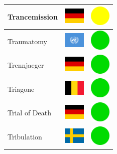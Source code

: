 \documentclass[12pt, a4paper, twoside]{report}
\begin{document}
\begin{center}
\begin{longtable}{|p{5cm}|p{2cm}|p{2cm}|}
 Trancemission                                              & \includegraphics[width=1cm]{../img/flags/de} &   \includegraphics[width=1cm]{../likes/m} \\ \hline
 Traumatomy                                                 & \includegraphics[width=1cm]{../img/flags/un} &   \includegraphics[width=1cm]{../likes/y} \\ \hline
 Trennjaeger                                                & \includegraphics[width=1cm]{../img/flags/de} &   \includegraphics[width=1cm]{../likes/y} \\ \hline
 Triagone                                                   & \includegraphics[width=1cm]{../img/flags/be} &   \includegraphics[width=1cm]{../likes/y} \\ \hline
 Trial of Death                                             & \includegraphics[width=1cm]{../img/flags/de} &   \includegraphics[width=1cm]{../likes/y} \\ \hline
 Tribulation                                                & \includegraphics[width=1cm]{../img/flags/se} &   \includegraphics[width=1cm]{../likes/y} \\ \hline

\end{longtable}
\end{center}
\end{document}
